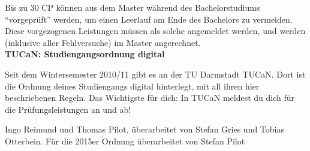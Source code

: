 {    Bis zu 30 CP können aus dem Master während des Bachelorstudiums "`vorgeprüft"' werden, um einen Leerlauf am Ende des Bachelors zu vermeiden. Diese vorgezogenen Leistungen müssen als solche angemeldet werden, und werden (inklusive aller Fehlversuche) im Master angerechnet.\\

    \noindent\textbf{TUCaN: Studiengangsordnung digital}

    Seit dem Wintersemester 2010/11 gibt es an der TU Darmstadt TUCaN. Dort ist die Ordnung deines Studiengangs digital hinterlegt, mit all ihren hier beschriebenen Regeln. Das Wichtigste für dich: In TUCaN meldest du dich für die Prüfungsleistungen an und ab!
}
{Ingo Reimund und Thomas Pilot, überarbeitet von Stefan Gries und Tobias Otterbein. Für die 2015er Ordnung überarbeitet von Stefan Pilot}
